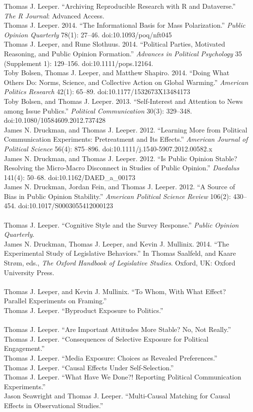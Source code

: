 \documentclass[12pt]{article}
\renewcommand{\section}[1]{\pagebreak[3]%
    \llap{\scshape\smash{\parbox[t]{\marginparwidth}{\raggedright {\color{lg}#1}}}}%
    \vspace{-\baselineskip}\par}
\newcommand{\topic}[1]{\pagebreak[3]\indent {\color{lg}{\footnotesize #1 }}\\}
\newcommand{\entry}[1]{\indent {\color{lg}\guillemotright}\hspace{2pt}#1\vspace{.25em}\\}
\begin{document}
\section{Peer-Reviewed Publications}
\entry{Thomas J. Leeper. ``Archiving Reproducible Research with R and Dataverse.'' {\em The R Journal}: Advanced Access.}
\entry{Thomas J. Leeper. 2014. ``The Informational Basis for Mass Polarization.'' {\em Public Opinion Quarterly} 78(1): 27--46. doi:10.1093/poq/nft045}
\entry{Thomas J. Leeper, and Rune Slothuus. 2014. ``Political Parties, Motivated Reasoning, and Public Opinion Formation.'' {\em Advances in Political Psychology} 35 (Supplement 1): 129--156. doi:10.1111/pops.12164.}
\entry{Toby Bolsen, Thomas J. Leeper, and Matthew Shapiro. 2014. ``Doing What Others Do: Norms, Science, and Collective Action on Global Warming.'' {\em American Politics Research} 42(1): 65--89. doi:10.1177/1532673X13484173}
\entry{Toby Bolsen, and Thomas J. Leeper. 2013. ``Self-Interest and Attention to News among Issue Publics.'' {\em Political Communication} 30(3): 329--348.\\ doi:10.1080/10584609.2012.737428}
\entry{James N. Druckman, and Thomas J. Leeper. 2012. ``Learning More from Political Communication Experiments: Pretreatment and Its Effects.'' {\em American Journal of Political Science} 56(4): 875--896. doi:10.1111/j.1540-5907.2012.00582.x}
\entry{James N. Druckman, and Thomas J. Leeper. 2012. ``Is Public Opinion Stable? Resolving the Micro-Macro Disconnect in Studies of Public Opinion.'' {\em Daedalus} 141(4): 50--68. doi:10.1162/DAED\_a\_00173}
\entry{James N. Druckman, Jordan Fein, and Thomas J. Leeper. 2012. ``A Source of Bias in Public Opinion Stability.'' {\em American Political Science Review} 106(2): 430--454. doi:10.1017/S0003055412000123}

\topic{Forthcoming}
\entry{Thomas J. Leeper. ``Cognitive Style and the Survey Response.'' {\em Public Opinion Quarterly}.}
\entry{James N. Druckman, Thomas J. Leeper, and Kevin J. Mullinix. 2014. ``The Experimental Study of Legislative Behaviors.'' In Thomas Saalfeld, and Kaare Str\o m, eds., {\em The Oxford Handbook of Legislative Studies}. Oxford, UK: Oxford University Press.}

\topic{Under Review}
\entry{Thomas J. Leeper, and Kevin J. Mullinix. ``To Whom, With What Effect? Parallel Experiments on Framing.''}
\entry{Thomas J. Leeper. ``Byproduct Exposure to Politics.''}

\topic{Working Papers and Ongoing Projects}
\entry{Thomas J. Leeper. ``Are Important Attitudes More Stable? No, Not Really.''}
\entry{Thomas J. Leeper. ``Consequences of Selective Exposure for Political Engagement.''}
\entry{Thomas J. Leeper. ``Media Exposure: Choices as Revealed Preferences.''}
\entry{Thomas J. Leeper. ``Causal Effects Under Self-Selection.''}
\entry{Thomas J. Leeper. ``What Have We Done?! Reporting Political Communication Experiments.''}
\entry{Jason Seawright and Thomas J. Leeper. ``Multi-Causal Matching for Causal Effects in Observational Studies.''}
\end{document}

